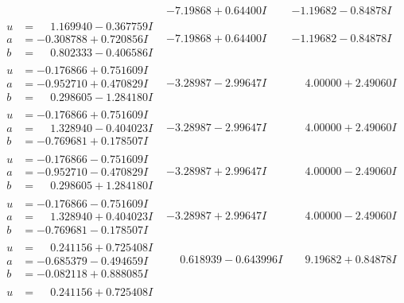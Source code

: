 \documentclass[1p]{elsarticle_modified}
\theoremstyle{definition}
\begin{document}
$$\begin{array}{c|c|c}
 & -7.19868 + 0.64400 I & -1.19682 - 0.84878 I \\ \hline\begin{aligned}
u &= \phantom{-}1.169940 - 0.367759 I \\
a &= -0.308788 + 0.720856 I \\
b &= \phantom{-}0.802333 - 0.406586 I\end{aligned}
 & -7.19868 + 0.64400 I & -1.19682 - 0.84878 I \\ \hline\begin{aligned}
u &= -0.176866 + 0.751609 I \\
a &= -0.952710 + 0.470829 I \\
b &= \phantom{-}0.298605 - 1.284180 I\end{aligned}
 & -3.28987 - 2.99647 I & \phantom{-}4.00000 + 2.49060 I \\ \hline\begin{aligned}
u &= -0.176866 + 0.751609 I \\
a &= \phantom{-}1.328940 - 0.404023 I \\
b &= -0.769681 + 0.178507 I\end{aligned}
 & -3.28987 - 2.99647 I & \phantom{-}4.00000 + 2.49060 I \\ \hline\begin{aligned}
u &= -0.176866 - 0.751609 I \\
a &= -0.952710 - 0.470829 I \\
b &= \phantom{-}0.298605 + 1.284180 I\end{aligned}
 & -3.28987 + 2.99647 I & \phantom{-}4.00000 - 2.49060 I \\ \hline\begin{aligned}
u &= -0.176866 - 0.751609 I \\
a &= \phantom{-}1.328940 + 0.404023 I \\
b &= -0.769681 - 0.178507 I\end{aligned}
 & -3.28987 + 2.99647 I & \phantom{-}4.00000 - 2.49060 I \\ \hline\begin{aligned}
u &= \phantom{-}0.241156 + 0.725408 I \\
a &= -0.685379 - 0.494659 I \\
b &= -0.082118 + 0.888085 I\end{aligned}
 & \phantom{-}0.618939 - 0.643996 I & \phantom{-}9.19682 + 0.84878 I \\ \hline\begin{aligned}
u &= \phantom{-}0.241156 + 0.725408 I \\

\end{aligned}
\end{array}$$
\end{document}
